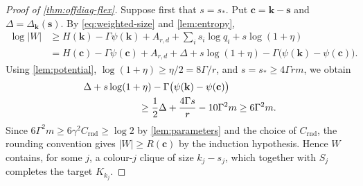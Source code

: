 \documentclass[11pt]{article}
\theoremstyle{definition}
\newcommand{\kk}{\mathbf k}
\newcommand{\ssv}{\mathbf s}
\newcommand{\cc}{\mathbf c}
\newcommand{\Ent}{H}
\newcommand{\DG}{\Delta}
\newcommand{\pot}{\psi}
\begin{document}
\begin{proof}[Proof of \cref{thm:offdiag-flex}]
Suppose first that $s=s_\ast$.  Put $\cc=\kk-\ssv$ and
$\DG=\DG_{\kk}(\ssv)$.  By \eqref{eq:weighted-size} and
\cref{lem:entropy},
\begin{align*}
 \log|W|
 &\ge \Ent(\kk)-\Gamma\pot(\kk)+A_{r,d}
      +\sum_i s_i\log q_i+s\log(1+\eta)\\
 &=\Ent(\cc)-\Gamma\pot(\cc)+A_{r,d}
   +\DG+s\log(1+\eta)
   -\Gamma\bigl(\pot(\kk)-\pot(\cc)\bigr).
\end{align*}
Using \cref{lem:potential},
$\log(1+\eta)\ge\eta/2=8\Gamma/r$, and
$s=s_\ast\ge4\Gamma rm$, we obtain
\begin{align}
 &\DG+s\log(1+\eta)
 -\Gamma\bigl(\pot(\kk)-\pot(\cc)\bigr)\notag\\
 &\hspace{2cm}\ge
 \frac12\DG+\frac{4\Gamma s}{r}-10\Gamma^2m
 \ge6\Gamma^2m.\label{eq:long-margin}
\end{align}
Since $6\Gamma^2m\ge6\gamma^2C_{\mathrm{rnd}}\ge\log2$ by
\cref{lem:parameters} and the choice of $C_{\mathrm{rnd}}$, the rounding
convention gives $|W|\ge R(\cc)$ by the induction hypothesis.  Hence $W$
contains, for some $j$, a colour-$j$ clique of size $k_j-s_j$, which
together with $S_j$ completes the target $K_{k_j}$.


\end{proof}
\end{document}
